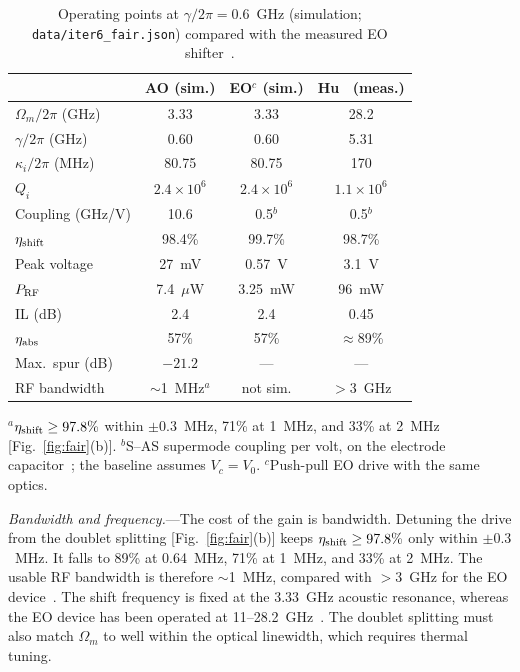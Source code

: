 \documentclass[aps,prl,reprint,superscriptaddress,amsmath,amssymb,floatfix]{revtex4-2}
\newcommand{\etash}{\eta_{\rm shift}}
\newcommand{\etaabs}{\eta_{\rm abs}}
\begin{document}
\begin{table}[b]
\caption{Operating points at $\gamma/2\pi=0.6$~GHz (simulation; \texttt{data/iter6\_fair.json}) compared with the measured EO shifter~\cite{Hu2021}.}
\label{tab:main}
\begin{ruledtabular}
\small
\begin{tabular}{lccc}
 & AO (sim.) & EO$^{c}$ (sim.) & Hu~\cite{Hu2021} (meas.)\\
\hline
$\Omega_m/2\pi$ (GHz) & 3.33 & 3.33 & 28.2\\
$\gamma/2\pi$ (GHz) & 0.60 & 0.60 & 5.31\\
$\kappa_i/2\pi$ (MHz) & 80.75 & 80.75 & 170\\
$Q_i$ & $2.4\times10^6$ & $2.4\times10^6$ & $1.1\times10^6$\\
Coupling (GHz/V) & 10.6 & 0.5$^{b}$ & 0.5$^{b}$\\
$\etash$ & 98.4\% & 99.7\% & 98.7\%\\
Peak voltage & 27~mV & 0.57~V & 3.1~V\\
$P_{\rm RF}$ & 7.4~$\mu$W & 3.25~mW & 96~mW\\
IL (dB) & 2.4 & 2.4 & 0.45\\
$\etaabs$ & 57\% & 57\% & $\approx$89\%\\
Max.\ spur (dB) & $-21.2$ & --- & ---\\
RF bandwidth & $\sim$1~MHz$^{a}$ & not sim. & $>$3~GHz\\
\end{tabular}
\end{ruledtabular}
\raggedright\footnotesize $^{a}$$\etash\ge97.8\%$ within $\pm0.3$~MHz, 71\% at 1~MHz, and 33\% at 2~MHz [Fig.~\ref{fig:fair}(b)]. $^{b}$S--AS supermode coupling per volt, on the electrode capacitor~\cite{Hu2021}; the baseline assumes $V_c=V_0$. $^{c}$Push-pull EO drive with the same optics.
\end{table}

\emph{Bandwidth and frequency.}---The cost of the gain is bandwidth. Detuning the drive from the doublet splitting [Fig.~\ref{fig:fair}(b)] keeps $\etash\ge97.8\%$ only within $\pm0.3$~MHz. It falls to 89\% at 0.64~MHz, 71\% at 1~MHz, and 33\% at 2~MHz. The usable RF bandwidth is therefore $\sim$1~MHz, compared with $>$3~GHz for the EO device~\cite{Hu2021}. The shift frequency is fixed at the 3.33~GHz acoustic resonance, whereas the EO device has been operated at 11--28.2~GHz~\cite{Hu2021}. The doublet splitting must also match $\Omega_m$ to well within the optical linewidth, which requires thermal tuning.
\end{document}
